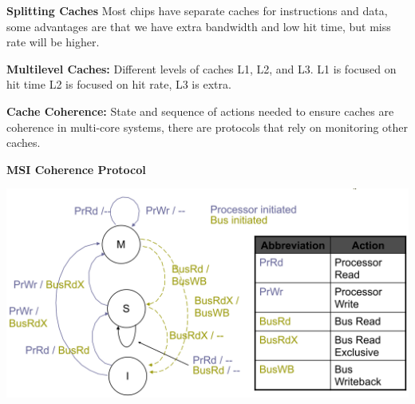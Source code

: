 \textbf{Splitting Caches} Most chips have separate caches for instructions and
data, some advantages are that we have extra bandwidth and low hit time, but miss
rate will be higher.

\textbf{Multilevel Caches:} Different levels of caches L1, L2, and L3. L1 is focused
on hit time L2 is focused on hit rate, L3 is extra.

\textbf{Cache Coherence:} State and sequence of actions needed to ensure caches
are coherence in multi-core systems, there are protocols that rely on monitoring
other caches.

\textbf{MSI Coherence Protocol}

\includegraphics[width=\linewidth]{png/msi.png}

\vfill\null
